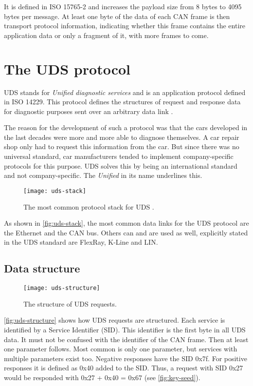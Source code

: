 It is defined in ISO 15765-2 and increases the payload size from 8 bytes to 4095 bytes per message. At least one byte of the data of each CAN frame is then transport protocol information, indicating whether this frame contains the entire application data or only a fragment of it, with more frames to come.

\section{The UDS protocol}

UDS stands for \emph{Unified diagnostic services} and is an application protocol defined in ISO 14229. This protocol defines the structures of request and response data for diagnostic purposes sent over an arbitrary data link \cite{iso14229}.

The reason for the development of such a protocol was that the cars developed in the last decades were more and more able to diagnose themselves. A car repair shop only had to request this information from the car. But since there was no universal standard, car manufacturers tended to implement company-specific protocols for this purpose. UDS solves this by being an international standard and not company-specific. The \emph{Unified} in its name underlines this. 

\begin{figure}[htb]
    \centering
    \texttt{[image: uds-stack]}
    \caption{The most common protocol stack for UDS \cite{Weiss2020}.}
    \label{fig:uds-stack}
\end{figure}

As shown in \autoref{fig:uds-stack}, the most common data links for the UDS protocol are the Ethernet and the CAN bus. Others can and are used as well, explicitly stated in the UDS standard are FlexRay, K-Line and LIN.

\subsection{Data structure}

\begin{figure}[htb]
    \centering
    \texttt{[image: uds-structure]}
    \caption{The structure of UDS requests.}
    \label{fig:uds-structure}
\end{figure}

\autoref{fig:uds-structure} shows how UDS requests are structured. Each service is identified by a Service Identifier (SID). This identifier is the first byte in all UDS data. It must not be confused with the identifier of the CAN frame. Then at least one parameter follows. Most common is only one parameter, but services with multiple parameters exist too.
Negative responses have the SID 0x7f.
For positive responses it is defined as 0x40 added to the SID. Thus, a request with SID 0x27 would be responded with 0x27 + 0x40 = 0x67 (see \autoref{fig:key-seed}).

